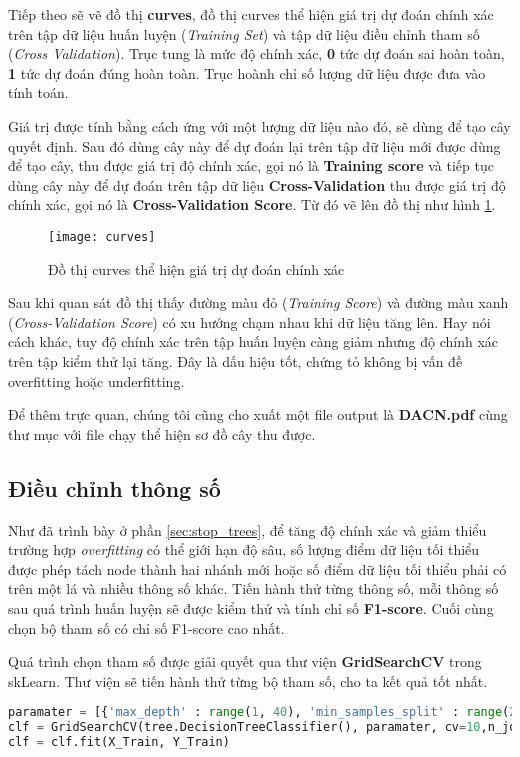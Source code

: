 \documentclass[../main-report.tex]{subfiles}
\begin{document}
Tiếp theo sẽ vẽ đồ thị \textbf{curves}, đồ thị curves thể hiện giá trị dự đoán chính xác trên tập dữ liệu huấn luyện (\emph{Training Set}) và tập dữ liệu điều chỉnh tham số (\emph{Cross Validation}). Trục tung là mức độ chính xác, \textbf{0} tức dự đoán sai hoàn toàn, \textbf{1} tức dự đoán đúng hoàn toàn. Trục hoành chỉ số lượng dữ liệu được đưa vào tính toán.

Giá trị được tính bằng cách ứng với một lượng dữ liệu nào đó, sẽ dùng để tạo cây quyết định. Sau đó dùng cây này để dự đoán lại trên tập dữ liệu mới được dùng để tạo cây, thu được giá trị độ chính xác, gọi nó là \textbf{Training score} và tiếp tục dùng cây này để dự đoán trên tập dữ liệu \textbf{Cross-Validation} thu được giá trị độ chính xác, gọi nó là \textbf{Cross-Validation Score}. Từ đó vẽ lên đồ thị như hình \ref{fig:res_curves}.

\begin{figure}[ht!]
\centering\texttt{[image: curves]}
\caption{Đồ thị curves thể hiện giá trị dự đoán chính xác}
\label{fig:res_curves}
\end{figure}

Sau khi quan sát đồ thị thấy đường màu đỏ (\emph{Training Score}) và đường màu xanh (\emph{Cross-Validation Score}) có xu hướng chạm nhau khi dữ liệu tăng lên. Hay nói cách khác, tuy độ chính xác trên tập huấn luyện càng giảm nhưng độ chính xác trên tập kiểm thử lại tăng. Đây là dấu hiệu tốt, chứng tỏ không bị vấn đề overfitting hoặc underfitting.

Để thêm trực quan, chúng tôi cũng cho xuất một file output là \textbf{DACN.pdf} cùng thư mục với file chạy thể hiện sơ đồ cây thu được.
\subsection{Điều chỉnh thông số}
Như đã trình bày ở phần \ref{sec:stop_trees}, để tăng độ chính xác và giảm thiểu trường hợp \emph{overfitting} có thể giới hạn độ sâu, số lượng điểm dữ liệu tối thiểu được phép tách node thành hai nhánh mới hoặc số điểm dữ liệu tối thiểu phải có trên một lá và nhiều thông số khác. Tiến hành thử từng thông số, mỗi thông số sau quá trình huấn luyện sẽ được kiểm thử và tính chỉ số \textbf{F1-score}. Cuối cùng chọn bộ tham số có chỉ số F1-score cao nhất.

Quá trình chọn tham số được giải quyết qua thư viện \textbf{GridSearchCV} trong skLearn. Thư viện sẽ tiến hành thử từng bộ tham số, cho ta kết quả tốt nhất.

\begin{lstlisting}[language=Python]
paramater = [{'max_depth' : range(1, 40), 'min_samples_split' : range(2,50), 'min_samples_leaf' : range(1,10)}]
clf = GridSearchCV(tree.DecisionTreeClassifier(), paramater, cv=10,n_jobs=6)
clf = clf.fit(X_Train, Y_Train)
\end{lstlisting}
\end{document}

